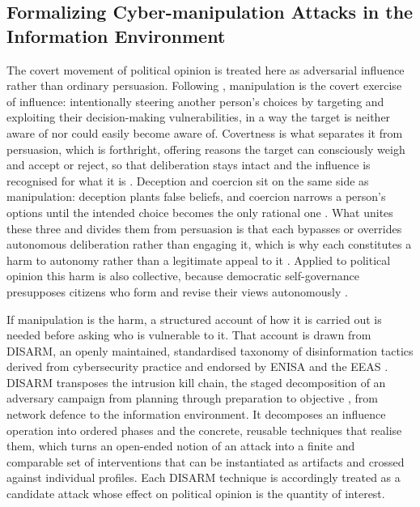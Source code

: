 \documentclass[11pt,a4paper]{article}
\begin{document}
\subsection{Formalizing Cyber-manipulation Attacks in the Information Environment}

The covert movement of political opinion is treated here as adversarial influence rather
than ordinary persuasion. Following \citet{susser2019technology}, manipulation is the
covert exercise of influence: intentionally steering another person's choices by
targeting and exploiting their decision-making vulnerabilities, in a way the target is
neither aware of nor could easily become aware of. Covertness is what separates it from
persuasion, which is forthright, offering reasons the target can consciously weigh and
accept or reject, so that deliberation stays intact and the influence is recognised for
what it is \citep{botes2023autonomy,sheikh2023persuasion}. Deception and coercion sit on
the same side as manipulation: deception plants false beliefs, and coercion narrows a
person's options until the intended choice becomes the only rational one
\citep{botes2023autonomy}. What unites these three and divides them from persuasion is
that each bypasses or overrides autonomous deliberation rather than engaging it, which is
why each constitutes a harm to autonomy rather than a legitimate appeal to it
\citep{botes2023autonomy,susser2019technology}. Applied to political opinion this harm is
also collective, because democratic self-governance presupposes citizens who form and
revise their views autonomously \citep{susser2019technology}.

If manipulation is the harm, a structured account of how it is carried out is needed
before asking who is vulnerable to it. That account is drawn from DISARM, an openly
maintained, standardised taxonomy of disinformation tactics derived from cybersecurity
practice and endorsed by ENISA and the EEAS \citep{disarmfoundationnd,enisaeeas2022fimi}.
DISARM transposes the intrusion kill chain, the staged decomposition of an adversary
campaign from planning through preparation to objective \citep{hutchins2011intelligence},
from network defence to the information environment. It decomposes an influence operation
into ordered phases and the concrete, reusable techniques that realise them, which turns
an open-ended notion of an attack into a finite and comparable set of interventions that
can be instantiated as artifacts and crossed against individual profiles. Each DISARM
technique is accordingly treated as a candidate attack whose effect on political opinion
is the quantity of interest.
\end{document}
